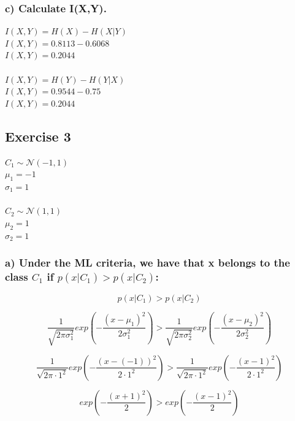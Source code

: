 \documentclass[a4paper]{article}
\begin{document}
\subsubsection{c) Calculate I(X,Y).}

$ I(X,Y) = H(X) - H(X|Y)        $\\
$ I(X,Y) = 0.8113 - 0.6068      $\\
$ \boxed{ I(X,Y) = 0.2044 }     $\\
\\
$ I(X,Y) = H(Y) - H(Y|X)        $\\
$ I(X,Y) = 0.9544 - 0.75        $\\
$ \boxed{ I(X,Y) = 0.2044 }     $\\

\subsection{Exercise 3}

$ C_1\sim\mathcal{N}(-1,1)      $\\
$ \mu_1 = -1                    $\\
$ \sigma_1 = 1                  $\\
\\
$ C_2\sim\mathcal{N}(1,1)       $\\
$ \mu_2 = 1                     $\\
$ \sigma_2 = 1                  $\\

\subsubsection{a) Under the ML criteria, we have that x belongs to the class \texorpdfstring{$C_1$ if $p(x|C_1) > p(x|C_2)$}{C1 if p(x|C1) > p(x|C2)}:}

$$ p(x|C_1) > p(x|C_2) $$

$$ \frac{1}{\sqrt{2\pi\sigma_1^2}}exp\left(-\frac{(x-\mu_1)^2}{2 \sigma_1^2}\right) > \frac{1}{\sqrt{2\pi\sigma_2^2}}exp\left(-\frac{(x-\mu_2)^2}{2 \sigma_2^2}\right) $$

$$ \frac{1}{\sqrt{2\pi\cdot1^2}}exp\left(-\frac{(x-(-1))^2}{2\cdot1^2}\right) > \frac{1}{\sqrt{2\pi\cdot1^2}}exp\left(-\frac{(x-1)^2}{2\cdot1^2}\right) $$

$$ exp\left(-\frac{(x+1)^2}{2}\right) > exp\left(-\frac{(x-1)^2}{2}\right) $$
\end{document}
